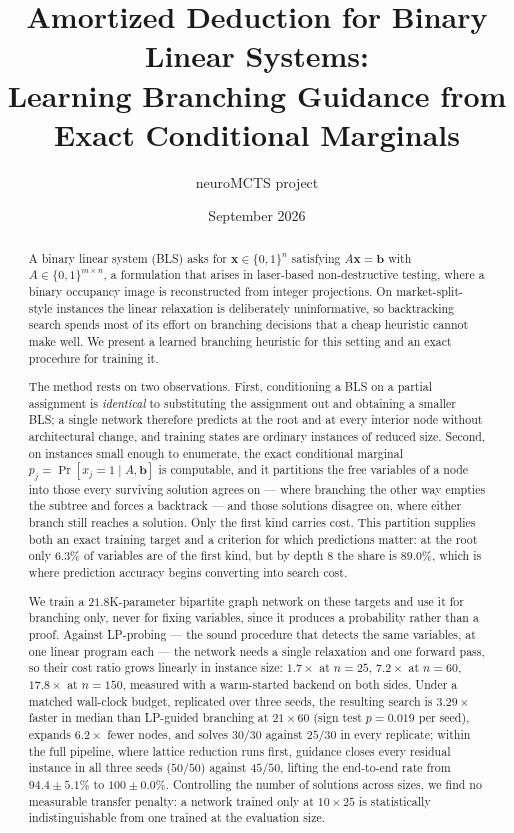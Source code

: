 \documentclass[11pt]{article}
\title{Amortized Deduction for Binary Linear Systems:\\
Learning Branching Guidance from Exact Conditional Marginals}
\author{neuroMCTS project}
\date{September 2026}
\begin{document}
\maketitle

\begin{abstract}
A binary linear system (BLS) asks for $\mathbf{x}\in\{0,1\}^n$ satisfying $A\mathbf{x}=\mathbf{b}$ with $A\in\{0,1\}^{m\times n}$, a formulation that arises in laser-based non-destructive testing, where a binary occupancy image is reconstructed from integer projections. On market-split-style instances the linear relaxation is deliberately uninformative, so backtracking search spends most of its effort on branching decisions that a cheap heuristic cannot make well. We present a learned branching heuristic for this setting and an exact procedure for training it.

The method rests on two observations. First, conditioning a BLS on a partial assignment is \emph{identical} to substituting the assignment out and obtaining a smaller BLS; a single network therefore predicts at the root and at every interior node without architectural change, and training states are ordinary instances of reduced size. Second, on instances small enough to enumerate, the exact conditional marginal $p_j=\Pr[x_j=1\mid A,\mathbf{b}]$ is computable, and it partitions the free variables of a node into those every surviving solution agrees on --- where branching the other way empties the subtree and forces a backtrack --- and those solutions disagree on, where either branch still reaches a solution. Only the first kind carries cost. This partition supplies both an exact training target and a criterion for which predictions matter: at the root only $6.3\%$ of variables are of the first kind, but by depth $8$ the share is $89.0\%$, which is where prediction accuracy begins converting into search cost.

We train a $21.8$K-parameter bipartite graph network on these targets and use it for branching only, never for fixing variables, since it produces a probability rather than a proof. Against LP-probing --- the sound procedure that detects the same variables, at one linear program each --- the network needs a single relaxation and one forward pass, so their cost ratio grows linearly in instance size: $1.7\times$ at $n=25$, $7.2\times$ at $n=60$, $17.8\times$ at $n=150$, measured with a warm-started backend on both sides. Under a matched wall-clock budget, replicated over three seeds, the resulting search is $3.29\times$ faster in median than LP-guided branching at $21\times60$ (sign test $p=0.019$ per seed), expands $6.2\times$ fewer nodes, and solves $30/30$ against $25/30$ in every replicate; within the full pipeline, where lattice reduction runs first, guidance closes every residual instance in all three seeds ($50/50$) against $45/50$, lifting the end-to-end rate from $94.4\pm5.1\%$ to $100\pm0.0\%$. Controlling the number of solutions across sizes, we find no measurable transfer penalty: a network trained only at $10\times25$ is statistically indistinguishable from one trained at the evaluation size.


\end{abstract}
\end{document}
